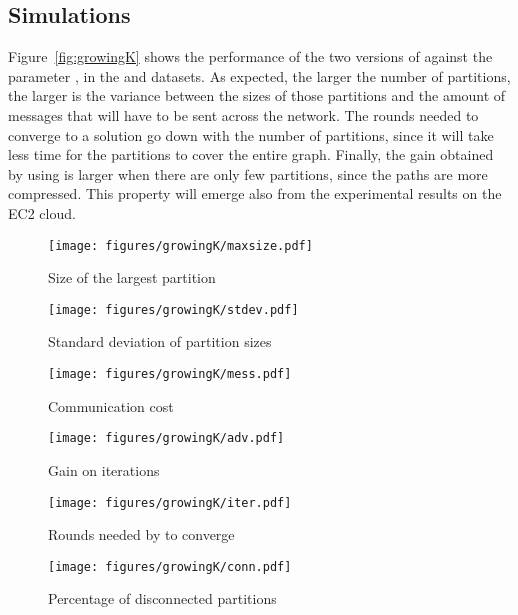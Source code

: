 \subsection{Simulations}

Figure~\ref{fig:growingK} shows the performance of the two versions of
\dfep against the parameter , in the  and
 datasets. As expected, the larger the number of partitions, the larger
is the variance between the sizes of those partitions and the amount of
messages that will have to be sent across the network. The rounds needed to
converge to a solution go down with the number of partitions, since it will
take less time for the partitions to cover the entire graph. Finally, the gain
obtained by using \etsch is larger when there are only few partitions, since
the paths are more compressed. This property will emerge also from the
experimental results on the EC2 cloud.

\begin{figure*}[!ht]
\setlength{\belowcaptionskip}{-5pt}
\captionsetup[subfigure]{skip=-12pt}

\begin{subfigure}[b]{0.45\textwidth}
\texttt{[image: figures/growingK/maxsize.pdf]}
\caption{Size of the largest partition}
\label{fig:growingK-maxsize}
\end{subfigure}
\hfill
\begin{subfigure}[b]{0.45\textwidth}
\texttt{[image: figures/growingK/stdev.pdf]}
\caption{Standard deviation of partition sizes}
\label{fig:growingK-stdev}
\end{subfigure}

\vspace{-5pt}
\begin{subfigure}[b]{0.45\textwidth}
\texttt{[image: figures/growingK/mess.pdf]}
\caption{Communication cost}
\label{fig:growingK-mess}
\end{subfigure}
\hfill
\begin{subfigure}[b]{0.45\textwidth}
\texttt{[image: figures/growingK/adv.pdf]}
\caption{Gain on iterations}
\label{fig:growingK-adv}
\end{subfigure}

\vspace{-5pt}
\begin{subfigure}[b]{0.45\textwidth}
\texttt{[image: figures/growingK/iter.pdf]}
\caption{Rounds needed by \dfep to converge}
\label{fig:growingK-iter}
\end{subfigure}
\hfill
\begin{subfigure}[b]{0.45\textwidth}
\texttt{[image: figures/growingK/conn.pdf]}
\caption{Percentage of disconnected partitions}
\label{fig:growingK-conn}
\end{subfigure}

\caption{Behavior of \dfep and \dfepc with different values of  ( samples)}
\label{fig:growingK}
\end{figure*}

